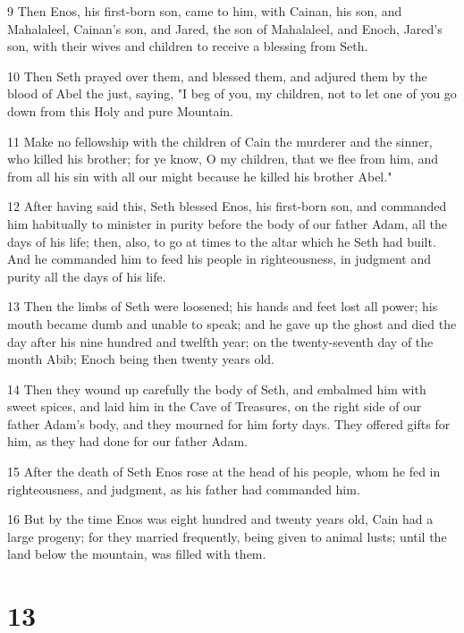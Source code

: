 \par 9 Then Enos, his first-born son, came to him, with Cainan, his son, and Mahalaleel, Cainan's son, and Jared, the son of Mahalaleel, and Enoch, Jared's son, with their wives and children to receive a blessing from Seth.

\par 10 Then Seth prayed over them, and blessed them, and adjured them by the blood of Abel the just, saying, "I beg of you, my children, not to let one of you go down from this Holy and pure Mountain.

\par 11 Make no fellowship with the children of Cain the murderer and the sinner, who killed his brother; for ye know, O my children, that we flee from him, and from all his sin with all our might because he killed his brother Abel."

\par 12 After having said this, Seth blessed Enos, his first-born son, and commanded him habitually to minister in purity before the body of our father Adam, all the days of his life; then, also, to go at times to the altar which he Seth had built. And he commanded him to feed his people in righteousness, in judgment and purity all the days of his life.

\par 13 Then the limbs of Seth were loosened; his hands and feet lost all power; his mouth became dumb and unable to speak; and he gave up the ghost and died the day after his nine hundred and twelfth year; on the twenty-seventh day of the month Abib; Enoch being then twenty years old.

\par 14 Then they wound up carefully the body of Seth, and embalmed him with sweet spices, and laid him in the Cave of Treasures, on the right side of our father Adam's body, and they mourned for him forty days. They offered gifts for him, as they had done for our father Adam.

\par 15 After the death of Seth Enos rose at the head of his people, whom he fed in righteousness, and judgment, as his father had commanded him.

\par 16 But by the time Enos was eight hundred and twenty years old, Cain had a large progeny; for they married frequently, being given to animal lusts; until the land below the mountain, was filled with them.

\chapter{13}

